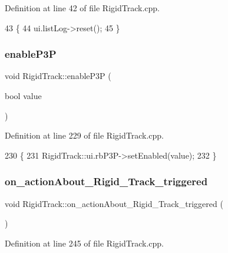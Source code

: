 Definition at line 42 of file Rigid\+Track.\+cpp.


\begin{DoxyCode}
43 \{
44     ui.listLog->reset();
45 \}
\end{DoxyCode}
\mbox{\label{class_rigid_track_a39aba14e1c846cb3f1773d9145cf96e1}} 
\subsubsection{\texorpdfstring{enable\+P3P}{enableP3P}}
{\footnotesize\ttfamily void Rigid\+Track\+::enable\+P3P (\begin{DoxyParamCaption}\item[{bool}]{value }\end{DoxyParamCaption})\hspace{0.3cm}{\ttfamily [slot]}}



Definition at line 229 of file Rigid\+Track.\+cpp.


\begin{DoxyCode}
230 \{
231     RigidTrack::ui.rbP3P->setEnabled(value);
232 \}
\end{DoxyCode}
\mbox{\label{class_rigid_track_ac9b641557306f6dff0ac73bc3a9b3f60}} 
\subsubsection{\texorpdfstring{on\+\_\+action\+About\+\_\+\+Rigid\+\_\+\+Track\+\_\+triggered}{on\_actionAbout\_Rigid\_Track\_triggered}}
{\footnotesize\ttfamily void Rigid\+Track\+::on\+\_\+action\+About\+\_\+\+Rigid\+\_\+\+Track\+\_\+triggered (\begin{DoxyParamCaption}{ }\end{DoxyParamCaption})\hspace{0.3cm}{\ttfamily [slot]}}



Definition at line 245 of file Rigid\+Track.\+cpp.


